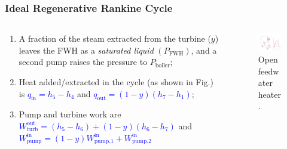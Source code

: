 \documentclass[10pt,compress,handout,ignorenonframetext]{beamer}
\begin{document}
\begin{frame}
 \frametitle{Ideal Regenerative Rankine Cycle}

  \begin{columns}
   \begin{column}[c]{0.5\linewidth}
    \begin{enumerate} %
      \item <1->  A fraction of the steam extracted from the turbine ($y$) leaves the FWH as a {\it saturated liquid} $\left(P_{\text{FWH}}\right)$, and a second pump raises the pressure to $P_{\text{boiler}}$;
      \item <2-> Heat added/extracted in the cycle (as shown in Fig.) is \textcolor{blue}{$q_{\text{in}}=h_{5}-h_{4}$} and \textcolor{blue}{$q_{\text{out}}=\left(1-y\right)\left(h_{7}-h_{1}\right)$};
      \item <3-> Pump and turbine work are \\
\medskip
       \textcolor{blue}{$W_{\text{turb}}^{\text{out}}=\left(h_{5}-h_{6}\right)+\left(1-y\right)\left(h_{6}-h_{7}\right)$}  and \\
\medskip
       \textcolor{blue}{$W_{\text{pump}}^{\text{in}}=\left(1-y\right)W_{\text{pump,1}}^{\text{in}}+W_{\text{pump,2}}^{\text{in}}$}
    \end{enumerate} 
   \end{column}

   \begin{column}[c]{0.5\linewidth} 
     \begin{figure}%
     \begin{center}
      \includegraphics[width=6.25cm,clip]{./Pics/Regenerative_Rankine_Cycle_OpenFWH}
      \caption{\scriptsize Open feedwater heater.} 
     \end{center}
    \end{figure}  
   \end{column}
  \end{columns}
 \normalsize
\end{frame}
\end{document}
